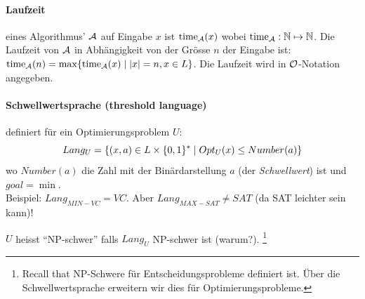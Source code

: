 \paragraph{Laufzeit}
eines Algorithmus' $\mathcal{A}$ auf Eingabe $x$ ist $\text{time}_{\mathcal{A}} (x)$
wobei $\text{time}_{\mathcal{A}}: \mathbb{N} \mapsto \mathbb{N}$.
Die Laufzeit von $\mathcal{A}$ in Abhängigkeit von der Grösse $n$ der Eingabe ist:
$\text{time}_{\mathcal{A}} (n) = \max \{ \text{time}_{\mathcal{A}} (x) \; | \; |x| = n, x \in L \}$.
Die Laufzeit wird in  $\mathcal{O}$-Notation angegeben.

\paragraph{Schwellwertsprache (threshold language)} definiert für ein Optimierungsproblem $U$:
$$ Lang_U = \{ (x, a) \in L \times \lbrace 0, 1 \rbrace^* \; | \; Opt_U(x) \leq Number(a) \} $$
wo $Number(a)$ die Zahl mit der Binärdarstellung $a$ (der \emph{Schwellwert}) ist und $goal = \min$.
\\
Beispiel: $Lang_{MIN-VC} = VC$. Aber $Lang_{MAX-SAT} \neq SAT$ (da SAT leichter sein kann)!

$U$ heisst ``NP-schwer'' falls $Lang_U$ NP-schwer ist (warum?).%
\footnote{Recall that NP-Schwere für Entscheidungsprobleme definiert ist.
Über die Schwellwertsprache erweitern wir dies für Optimierungsprobleme.}
